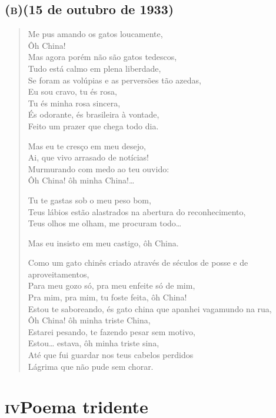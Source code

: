 \medskip

\section*{\textsc{(b)}\break(15 de outubro de 1933)}


\begin{verse}
Me pus amando os gatos loucamente,\\
Ôh China!\\
Mas agora porém não são gatos tedescos,\\
Tudo está calmo em plena liberdade,\\
Se foram as volúpias e as perversões tão azedas,\\
Eu sou cravo, tu és rosa,\\
Tu és minha rosa sincera,\\
És odorante, és brasileira à vontade,\\
Feito um prazer que chega todo dia.

Mas eu te cresço em meu desejo,\\
Ai, que vivo arrasado de notícias!\\
Murmurando com medo ao teu ouvido:\\
Ôh China! ôh minha China!\ldots{}

Tu te gastas sob o meu peso bom,\\
Teus lábios estão alastrados na abertura do reconhecimento,\\
Teus olhos me olham, me procuram todo\ldots{}

Mas eu insisto em meu castigo, ôh China.

Como um gato chinês criado através de séculos de posse e de aproveitamentos,\\
Para meu gozo só, pra meu enfeite só de mim,\\
Pra mim, pra mim, tu foste feita, ôh China!\\
Estou te saboreando, és gato china que apanhei vagamundo na rua,\\
Ôh China! ôh minha triste China,\\
Estarei pesando, te fazendo pesar sem motivo,\\
Estou\ldots{} estava, ôh minha triste sina,\\
Até que fui guardar nos teus cabelos perdidos\\
Lágrima que não pude sem chorar.
\end{verse}

\chapter[Poema tridente]{\textsc{iv}\break Poema tridente }

